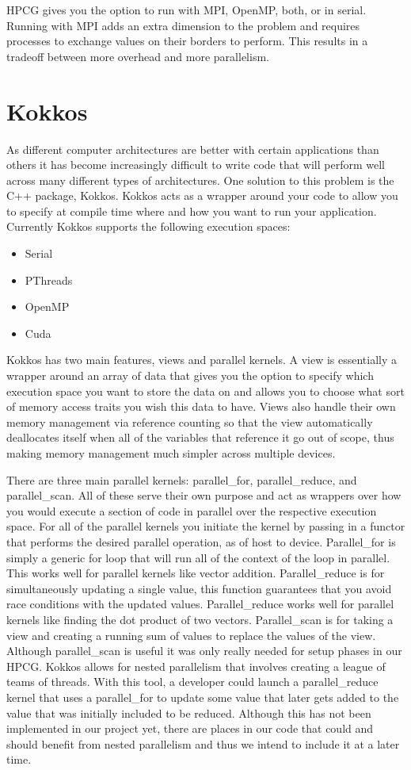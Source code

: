 \documentclass{ccr15}
\begin{document}
HPCG gives you the option to run with MPI, OpenMP, both, or in serial. Running with MPI adds an
extra dimension to the problem and requires processes to exchange values on their borders to
perform. This results in a tradeoff between more overhead and more parallelism.
\section{Kokkos}
As different computer architectures are better with certain applications than others it has
become increasingly difficult to write code that will perform well across many different types of
architectures. One solution to this problem is the C++ package, Kokkos. Kokkos acts as a wrapper
around your code to allow you to specify at compile time where and how you want to run your
application. Currently Kokkos supports the following execution spaces:
\begin{itemize}
\item Serial
\item PThreads
\item OpenMP
\item Cuda
\end{itemize}
Kokkos has two main features, views and parallel kernels. A view is essentially a wrapper around
an array of data that gives you the option to specify which execution space you want to store the
data on and allows you to choose what sort of memory access traits you wish this data to have.
Views also handle their own memory management via reference counting so that the view
automatically deallocates itself when all of the variables that reference it go out of scope,
thus making memory management much simpler across multiple devices.

There are three main parallel kernels: parallel\_for, parallel\_reduce, and parallel\_scan. All 
of these serve their own purpose and act as wrappers over how you would execute a section of 
code in parallel over the respective execution space. For all of the parallel kernels you 
initiate the kernel by passing in a functor that performs the desired parallel operation, as of 
host to device.
Parallel\_for is simply a generic for loop that will run all of the context of the loop in
parallel. This works well for parallel kernels like vector addition. Parallel\_reduce is for
simultaneously updating a single value, this function guarantees that you avoid race conditions
with the updated values. Parallel\_reduce works well for parallel kernels like finding the dot
product of two vectors. Parallel\_scan is for taking a view and creating a running sum of values
to replace the values of the view. Although parallel\_scan is useful it was only really needed
for setup phases in our HPCG.
Kokkos allows for nested parallelism that involves creating a league of teams of threads.
With this tool, a developer could launch a parallel\_reduce kernel that uses a parallel\_for to
update some value that later gets added to the value that was initially included to be reduced.
Although this has not been implemented in our project yet, there are places in our code that
could and should benefit from nested parallelism and thus we intend to include it at a later
time.
\end{document}
